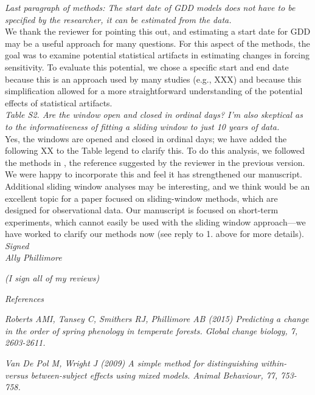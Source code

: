 \documentclass[11pt, a4paper]{article}
\begin{document}
\emph{Last paragraph of methods: The start date of GDD models does not have to be specified by the
researcher, it can be estimated from the data.}\\

We thank the reviewer for pointing this out, and estimating a start date for GDD \citep[as done in][]{roberts2015} may be a useful approach for many questions. For this aspect of the methods, the goal was to examine potential statistical artifacts in estimating changes in forcing sensitivity. To evaluate this potential, we chose a specific start and end date because this is an approach used by many studies (e.g., XXX) and because this simplification allowed for a more straightforward understanding of the potential effects of statistical artifacts.\\

 \emph{Table S2. Are the window open and closed in ordinal days? I'm also skeptical as to the informativeness
of fitting a sliding window to just 10 years of data.}\\

Yes, the windows are opened and closed in ordinal days; we have added the following XX to the Table legend to clarify this. To do this analysis, we followed the methods in \citet{simmonds2019}, the reference suggested by the reviewer in the previous version. We were happy to incorporate this and feel it has strengthened our manuscript. Additional sliding window analyses may be interesting, and we think would be an excellent topic for a paper focused on sliding-window methods, which are designed for observational data. Our manuscript is focused on short-term experiments, which cannot easily be used with the sliding window approach---we have worked to clarify our methods now (see reply to 1. above for more details).\\

 \emph{Signed}\\
 \emph{Ally Phillimore}

 \emph{(I sign all of my reviews)}

 \emph{References}

\emph{Roberts AMI, Tansey C, Smithers RJ, Phillimore AB (2015) Predicting a change in the order of spring
phenology in temperate forests. Global change biology, 7, 2603-2611.}

 \emph{Van De Pol M, Wright J (2009) A simple method for distinguishing within- versus between-subject effects
using mixed models. Animal Behaviour, 77, 753-758.}\\
\end{document}

